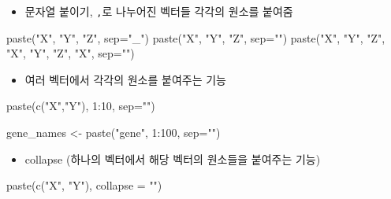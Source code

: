\documentclass[
]{book}
\newenvironment{Shaded}{\begin{snugshade}}{\end{snugshade}}
\newcommand{\AttributeTok}[1]{\textcolor[rgb]{0.77,0.63,0.00}{#1}}
\newcommand{\DecValTok}[1]{\textcolor[rgb]{0.00,0.00,0.81}{#1}}
\newcommand{\FunctionTok}[1]{\textcolor[rgb]{0.00,0.00,0.00}{#1}}
\newcommand{\NormalTok}[1]{#1}
\newcommand{\OtherTok}[1]{\textcolor[rgb]{0.56,0.35,0.01}{#1}}
\newcommand{\SpecialCharTok}[1]{\textcolor[rgb]{0.00,0.00,0.00}{#1}}
\newcommand{\StringTok}[1]{\textcolor[rgb]{0.31,0.60,0.02}{#1}}
\providecommand{\tightlist}{%
  \setlength{\itemsep}{0pt}\setlength{\parskip}{0pt}}
\begin{document}
\begin{itemize}
\tightlist
\item
  문자열 붙이기, \texttt{,}로 나누어진 벡터들 각각의 원소를 붙여줌
\end{itemize}

\begin{Shaded}
\begin{Highlighting}[]
\FunctionTok{paste}\NormalTok{(}\StringTok{"X"}\NormalTok{, }\StringTok{"Y"}\NormalTok{, }\StringTok{"Z"}\NormalTok{, }\AttributeTok{sep=}\StringTok{"\_"}\NormalTok{)}
\FunctionTok{paste}\NormalTok{(}\StringTok{"X"}\NormalTok{, }\StringTok{"Y"}\NormalTok{, }\StringTok{"Z"}\NormalTok{, }\AttributeTok{sep=}\StringTok{""}\NormalTok{)}
\FunctionTok{paste}\NormalTok{(}\StringTok{"X"}\NormalTok{, }\StringTok{"Y"}\NormalTok{, }\StringTok{"Z"}\NormalTok{, }\StringTok{"X"}\NormalTok{, }\StringTok{"Y"}\NormalTok{, }\StringTok{"Z"}\NormalTok{, }\StringTok{"X"}\NormalTok{, }\AttributeTok{sep=}\StringTok{""}\NormalTok{)}
\end{Highlighting}
\end{Shaded}

\begin{itemize}
\tightlist
\item
  여러 벡터에서 각각의 원소를 붙여주는 기능
\end{itemize}

\begin{Shaded}
\begin{Highlighting}[]
\FunctionTok{paste}\NormalTok{(}\FunctionTok{c}\NormalTok{(}\StringTok{"X"}\NormalTok{,}\StringTok{"Y"}\NormalTok{), }\DecValTok{1}\SpecialCharTok{:}\DecValTok{10}\NormalTok{, }\AttributeTok{sep=}\StringTok{""}\NormalTok{)}

\NormalTok{gene\_names }\OtherTok{\textless{}{-}} \FunctionTok{paste}\NormalTok{(}\StringTok{"gene"}\NormalTok{, }\DecValTok{1}\SpecialCharTok{:}\DecValTok{100}\NormalTok{, }\AttributeTok{sep=}\StringTok{""}\NormalTok{)}
\end{Highlighting}
\end{Shaded}

\begin{itemize}
\tightlist
\item
  collapse (하나의 벡터에서 해당 벡터의 원소들을 붙여주는 기능)
\end{itemize}

\begin{Shaded}
\begin{Highlighting}[]
\FunctionTok{paste}\NormalTok{(}\FunctionTok{c}\NormalTok{(}\StringTok{"X"}\NormalTok{, }\StringTok{"Y"}\NormalTok{), }\AttributeTok{collapse =} \StringTok{""}\NormalTok{)}
\end{Highlighting}
\end{Shaded}
\end{document}
